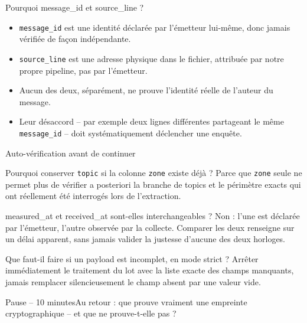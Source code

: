 \documentclass[aspectratio=169]{beamer}
\begin{document}
\begin{frame}{Pourquoi message\_id et source\_line ?}
\begin{itemize}
\item \texttt{message\_id} est une identité déclarée par l'émetteur lui-même, donc jamais vérifiée de façon indépendante.
\item \texttt{source\_line} est une adresse physique dans le fichier, attribuée par notre propre pipeline, pas par l'émetteur.
\item Aucun des deux, séparément, ne prouve l'identité réelle de l'auteur du message.
\item Leur désaccord -- par exemple deux lignes différentes partageant le même \texttt{message\_id} -- doit systématiquement déclencher une enquête.
\end{itemize}
\end{frame}

\begin{frame}{Auto-vérification avant de continuer}
\small
\begin{block}{Pourquoi conserver \texttt{topic} si la colonne \texttt{zone} existe déjà ?}
Parce que \texttt{zone} seule ne permet plus de vérifier a posteriori la branche de topics et le périmètre exacts qui ont réellement été interrogés lors de l'extraction.
\end{block}
\begin{block}{measured\_at et received\_at sont-elles interchangeables ?}
Non : l'une est déclarée par l'émetteur, l'autre observée par la collecte. Comparer les deux renseigne sur un délai apparent, sans jamais valider la justesse d'aucune des deux horloges.
\end{block}
\begin{block}{Que faut-il faire si un payload est incomplet, en mode strict ?}
Arrêter immédiatement le traitement du lot avec la liste exacte des champs manquants, jamais remplacer silencieusement le champ absent par une valeur vide.
\end{block}
\end{frame}

\begin{frame}{Pause -- 10 minutes}\centering\Large Au retour : que prouve vraiment une empreinte cryptographique -- et que ne prouve-t-elle pas ?\end{frame}
\end{document}
